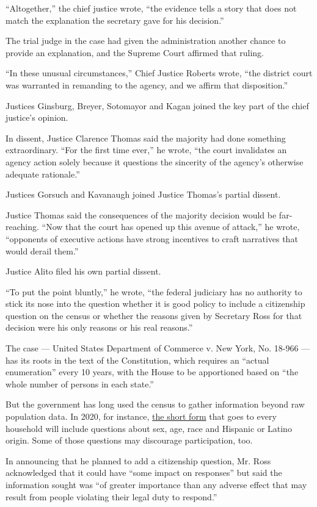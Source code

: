 ``Altogether,'' the chief justice wrote, ``the evidence tells a story
that does not match the explanation the secretary gave for his
decision.''

The trial judge in the case had given the administration another chance
to provide an explanation, and the Supreme Court affirmed that ruling.

``In these unusual circumstances,'' Chief Justice Roberts wrote, ``the
district court was warranted in remanding to the agency, and we affirm
that disposition.''

Justices Ginsburg, Breyer, Sotomayor and Kagan joined the key part of
the chief justice's opinion.

In dissent, Justice Clarence Thomas said the majority had done something
extraordinary. ``For the first time ever,'' he wrote, ``the court
invalidates an agency action solely because it questions the sincerity
of the agency's otherwise adequate rationale.''

Justices Gorsuch and Kavanaugh joined Justice Thomas's partial dissent.

Justice Thomas said the consequences of the majority decision would be
far-reaching. ``Now that the court has opened up this avenue of
attack,'' he wrote, ``opponents of executive actions have strong
incentives to craft narratives that would derail them.''

Justice Alito filed his own partial dissent.

``To put the point bluntly,'' he wrote, ``the federal judiciary has no
authority to stick its nose into the question whether it is good policy
to include a citizenship question on the census or whether the reasons
given by Secretary Ross for that decision were his only reasons or his
real reasons.''

The case --- United States Department of Commerce v. New York, No.
18-966 --- has its roots in the text of the Constitution, which requires
an ``actual enumeration'' every 10 years, with the House to be
apportioned based on ``the whole number of persons in each state.''

But the government has long used the census to gather information beyond
raw population data. In 2020, for instance,
\href{https://www.census.gov/newsroom/press-releases/2018/2020-question.html}{the
short form} that goes to every household will include questions about
sex, age, race and Hispanic or Latino origin. Some of those questions
may discourage participation, too.

In announcing that he planned to add a citizenship question, Mr. Ross
acknowledged that it could have ``some impact on responses'' but said
the information sought was ``of greater importance than any adverse
effect that may result from people violating their legal duty to
respond.''

